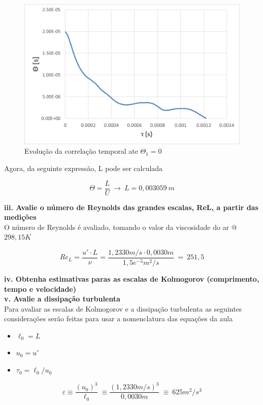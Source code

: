 \documentclass[12pt]{article}
\begin{document}
\begin{figure}[H]
	\centering
	\includegraphics[width=.65\textwidth]{figures/4}
	\caption{Evolução da correlação temporal ate $\Theta_1 = 0$}
\end{figure}

Agora, da seguinte expressão, L pode ser calculada

\begin{equation}
	\Theta = \frac{L}{U} \ \rightarrow \ L = 0,003059 \ m
\end{equation}

\textbf{iii. Avalie o número de Reynolds das grandes escalas, ReL, a partir das medições}\\

O número de Reynolds é avaliado, tomando o valor da viscosidade do ar @ $298,15 K$

\begin{equation}
	Re_L = \frac{u' \cdot L}{\nu} = \frac{1,2330 m/s \cdot 0,0030m}{1,5e^{-5} m^2/s } \ = \ 251,5
\end{equation}

\textbf{iv. Obtenha estimativas paras as escalas de Kolmogorov (comprimento, tempo e
velocidade)\\
v. Avalie a dissipação turbulenta}\\

Para avaliar as escalas de Kolmogorov e a dissipação turbulenta as seguintes considerações serão feitas para usar a nomenclatura das equações da aula
\begin{itemize}
	\item $\ell_0 = L$
	\item $u_0 = u'$
	\item $\tau_0 = \ell_0 / u_0$
\end{itemize}


\begin{equation}
	\varepsilon \equiv \frac{(u_0)^3}{\ell_0} \ \equiv \frac{(1,2330 m/s)^3}{0,0030m} \ \equiv \ 625 m^2/s^3
\end{equation}
\end{document}
